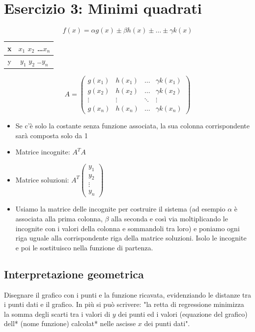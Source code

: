 \documentclass[10pt]{article}
\begin{document}
\section*{Esercizio 3: Minimi quadrati}
\begin{equation*}
    f(x) = \alpha g(x)\pm \beta h(x) \pm \ldots \pm \gamma k(x)
\end{equation*}
\begin{tabular}{c | c}
    x & $x_{1}$ $x_{2}$ \ldots $x_{n}$\\
    \hline
    y & $y_{1}$ $y_{2}$ \ldots $y_{n}$
\end{tabular}
\begin{equation*}
    A =
    \begin{pmatrix}
        g(x_{1}) & h(x_{1}) & \ldots & \gamma k(x_{1})\\
        g(x_{2}) & h(x_{2}) & \ldots & \gamma k(x_{2})\\
        \vdots & \vdots & \ddots & \vdots\\
        g(x_{n}) & h(x_{n}) & \ldots & \gamma k(x_{n})
    \end{pmatrix}
\end{equation*}
\begin{itemize}
    \item Se c'è solo la costante senza funzione associata, la sua colonna corrispondente sarà composta solo da 1
    \item Matrice incognite: $A^{T}A$
    \item Matrice soluzioni: $A^{T}\begin{pmatrix}
        y_{1} \\ y_{2} \\ \vdots \\ y_{n}
    \end{pmatrix}$
    \item Usiamo la matrice delle incognite per costruire il sistema (ad esempio $\alpha$ è associata alla prima colonna, $\beta$ alla seconda e così via moltiplicando le incognite con i valori della colonna e sommandoli tra loro) e poniamo ogni riga uguale alla corrispondente riga della matrice soluzioni. Isolo le incognite e poi le sostituisco nella funzione di partenza.
\end{itemize}
\subsection{Interpretazione geometrica}
Disegnare il grafico con i punti e la funzione ricavata, evidenziando le distanze tra i punti dati e il grafico. In più si può scrivere: "la retta di regressione minimizza la somma degli scarti tra i valori di $y$ dei punti ed i valori (equazione del grafico) dell* (nome funzione) calcolat* nelle ascisse $x$ dei punti dati".
\end{document}
